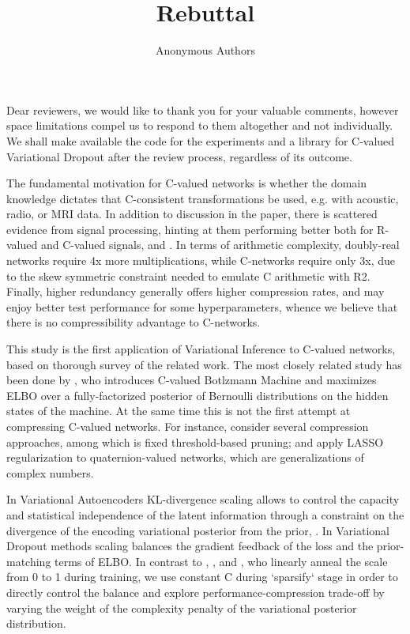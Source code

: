 \documentclass[10pt,a4paper,draft]{article}
\title{Rebuttal}
\author{Anonymous Authors}
\begin{document}

Dear reviewers, we would like to thank you for your valuable comments, however space
limitations compel us to respond to them altogether and not individually. We shall make
available the code for the experiments and a library for C-valued Variational Dropout
after the review process, regardless of its outcome.
\medskip

The fundamental motivation for C-valued networks is whether the domain knowledge
dictates that C-consistent transformations be used, e.g. with acoustic, radio, or MRI
data. In addition to discussion in the paper, there is scattered evidence from signal
processing, hinting at them performing better both for R-valued and C-valued signals,
\cite{tarver_design_2019,sivachitra_planning_2015} and \cite{hu_initial_2016}. In terms
of arithmetic complexity, doubly-real networks require 4x more multiplications, while
C-networks require only 3x, due to the skew symmetric constraint needed to emulate C
arithmetic with R2. Finally, higher redundancy generally offers higher compression
rates, and may enjoy better test performance for some hyperparameters, whence we
believe that there is no compressibility advantage to C-networks.

This study is the first application of Variational Inference to C-valued networks,
based on thorough survey of the related work. The most closely related study has
been done by \cite{popa_complex-valued_2018}, who introduces C-valued Botlzmann Machine
and maximizes ELBO over a fully-factorized posterior of Bernoulli distributions on
the hidden states of the machine. At the same time this is not the first attempt at
compressing C-valued networks. For instance, \cite{wu_compressing_2019} consider
several compression approaches, among which is fixed threshold-based pruning; and
\cite{vecchi_compressing_2020} apply LASSO regularization to quaternion-valued networks,
which are generalizations of complex numbers.

In Variational Autoencoders KL-divergence scaling allows to control the capacity and
statistical independence of the latent information through a constraint on the divergence
of the encoding variational posterior from the prior, \cite{higgins_beta-vae_2017}.
In Variational Dropout methods scaling balances the gradient feedback of the loss
and the prior-matching terms of ELBO. In contrast to \cite{molchanov_variational_2017},
\cite{kharitonov_variational_2018}, and \cite{gale_state_2019}, who linearly anneal
the scale from 0 to 1 during training, we use constant C during `sparsify` stage in
order to directly control the balance and explore performance-compression trade-off
by varying the weight of the complexity penalty of the variational posterior distribution.
\end{document}
